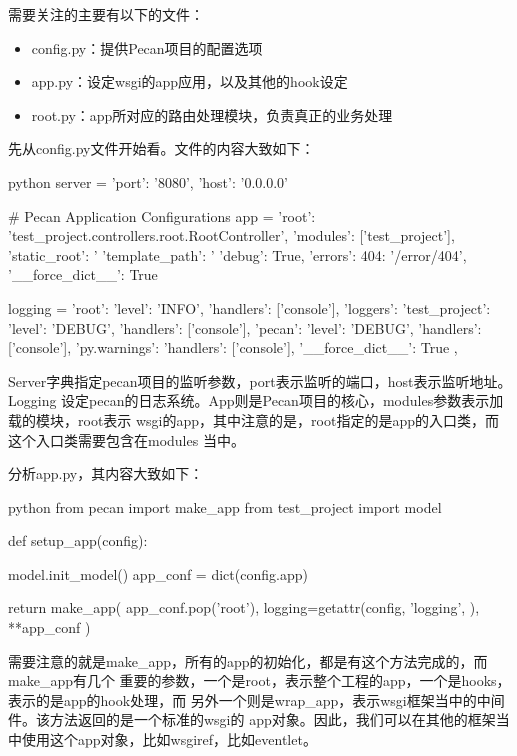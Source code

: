 需要关注的主要有以下的文件：
\begin{itemize}
  \item config.py：提供Pecan项目的配置选项
  \item app.py：设定wsgi的app应用，以及其他的hook设定
  \item root.py：app所对应的路由处理模块，负责真正的业务处理
\end{itemize}

先从config.py文件开始看。文件的内容大致如下：
\begin{code-block}{python}
server = {
    'port': '8080',
    'host': '0.0.0.0'
}

# Pecan Application Configurations
app = {
    'root': 'test_project.controllers.root.RootController',
    'modules': ['test_project'],
    'static_root': '%
    'template_path': '%
    'debug': True,
    'errors': {
        404: '/error/404',
        '__force_dict__': True
    }
}

logging = {
    'root': {'level': 'INFO', 'handlers': ['console']},
    'loggers': {
        'test_project': {'level': 'DEBUG', 'handlers': ['console']},
        'pecan': {'level': 'DEBUG', 'handlers': ['console']},
        'py.warnings': {'handlers': ['console']},
        '__force_dict__': True
    },
}
\end{code-block}

Server字典指定pecan项目的监听参数，port表示监听的端口，host表示监听地址。Logging
设定pecan的日志系统。App则是Pecan项目的核心，modules参数表示加载的模块，root表示
wsgi的app，其中注意的是，root指定的是app的入口类，而这个入口类需要包含在modules
当中。

分析app.py，其内容大致如下：
\begin{code-block}{python}
from pecan import make_app
from test_project import model


def setup_app(config):

    model.init_model()
    app_conf = dict(config.app)

    return make_app(
        app_conf.pop('root'),
        logging=getattr(config, 'logging', {}),
        **app_conf
    )
\end{code-block}

需要注意的就是make\_app，所有的app的初始化，都是有这个方法完成的，而make\_app有几个
重要的参数，一个是root，表示整个工程的app，一个是hooks，表示的是app的hook处理，而
另外一个则是wrap\_app，表示wsgi框架当中的中间件。该方法返回的是一个标准的wsgi的
app对象。因此，我们可以在其他的框架当中使用这个app对象，比如wsgiref，比如eventlet。

